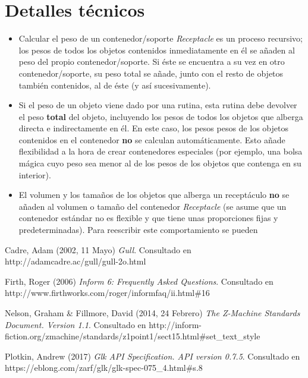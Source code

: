 \documentclass[a4paper,12pt]{article}
\numberwithin{equation}{section}
\begin{document}

\section{Detalles técnicos} \label{sec:detalles-tecnicos}

\begin{itemize}

\item Calcular el peso de un contenedor/soporte \emph{Receptacle} es un proceso recursivo; los pesos de todos los objetos contenidos inmediatamente en él se añaden al peso del propio contenedor/soporte. Si éste se encuentra a su vez en otro contenedor/soporte, su peso total se añade, junto con el resto de objetos también contenidos, al de éste (y así sucesivamente).

\item Si el peso de un objeto viene dado por una rutina, esta rutina debe devolver el peso \textbf{total} del objeto, incluyendo los pesos de todos los objetos que alberga directa e indirectamente en él. En este caso, los pesos pesos de los objetos contenidos en el contenedor \textbf{no} se calculan automáticamente. Esto añade flexibilidad a la hora de crear contenedores especiales (por ejemplo, una bolsa mágica cuyo peso sea menor al de los pesos de los objetos que contenga en su interior).

\item El volumen y los tamaños de los objetos que alberga un receptáculo \textbf{no} se añaden al volumen o tamaño del contenedor \emph{Receptacle} (se asume que un contenedor estándar no es flexible y que tiene unas proporciones fijas y predeterminadas). Para reescribir este comportamiento se pueden
\end{itemize}





\begin{thebibliography}{4}

	 Cadre, Adam (2002, 11 Mayo) \emph{Gull}. Consultado en http://adamcadre.ac/gull/gull-2o.html

	 Firth, Roger (2006) \emph{Inform 6: Frequently Asked Questions}. Consultado en http://www.firthworks.com/roger/informfaq/ii.html\#16

	 Nelson, Graham \& Fillmore, David (2014, 24 Febrero) \emph{The Z-Machine Standards Document. Version 1.1}. Consultado en http://inform-fiction.org/zmachine/standards/z1point1/sect15.html\#set\_text\_style

	 Plotkin, Andrew (2017) \emph{Glk API Specification. API version 0.7.5}. Consultado en https://eblong.com/zarf/glk/glk-spec-075\_4.html\#s.8

\end{thebibliography}


\end{document}
